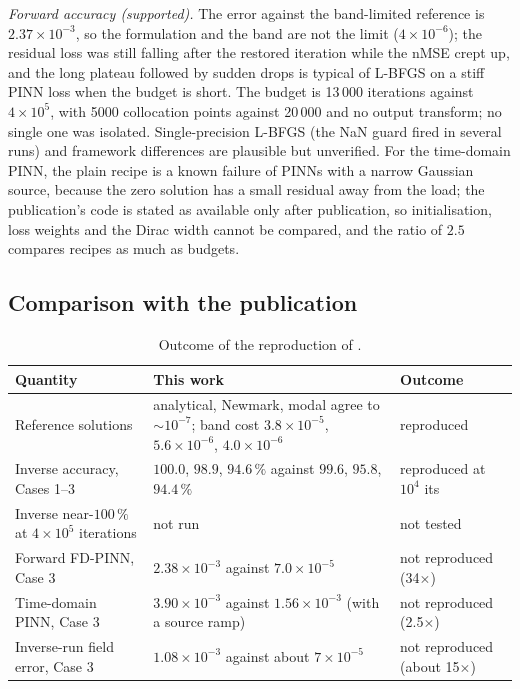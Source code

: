 \emph{Forward accuracy (supported).} The error against the band-limited reference is $2.37\times10^{-3}$, so the formulation and the band are not the limit ($4\times10^{-6}$); the residual loss was still falling after the restored iteration while the nMSE crept up, and the long plateau followed by sudden drops is typical of L-BFGS on a stiff PINN loss when the budget is short. The budget is 13\,000 iterations against $4\times10^5$, with 5000 collocation points against 20\,000 and no output transform; no single one was isolated. Single-precision L-BFGS (the NaN guard fired in several runs) and framework differences are plausible but unverified. For the time-domain PINN, the plain recipe is a known failure of PINNs with a narrow Gaussian source, because the zero solution has a small residual away from the load; the publication's code is stated as available only after publication, so initialisation, loss weights and the Dirac width cannot be compared, and the ratio of $2.5$ compares recipes as much as budgets.

\subsection*{Comparison with the publication}

\begin{table}[tbp]
\centering\footnotesize
\caption{Outcome of the reproduction of \citet{liang2024fdpinn}.}\label{tab:vf-fd-cmp}
\begin{tabularx}{\linewidth}{@{}>{\raggedright\arraybackslash}p{4.4cm} >{\raggedright\arraybackslash}X >{\raggedright\arraybackslash}p{2.6cm}@{}}
\toprule
Quantity & This work & Outcome\\
\midrule
Reference solutions & analytical, Newmark, modal agree to $\sim10^{-7}$; band cost $3.8\times10^{-5}$, $5.6\times10^{-6}$, $4.0\times10^{-6}$ & reproduced\\
Inverse accuracy, Cases 1--3 & $100.0$, $98.9$, $94.6\,\%$ against $99.6$, $95.8$, $94.4\,\%$ & reproduced at $10^4$ its\\
Inverse near-$100\,\%$ at $4\times10^5$ iterations & not run & not tested\\
Forward FD-PINN, Case 3 & $2.38\times10^{-3}$ against $7.0\times10^{-5}$ & not reproduced (34$\times$)\\
Time-domain PINN, Case 3 & $3.90\times10^{-3}$ against $1.56\times10^{-3}$ (with a source ramp) & not reproduced (2.5$\times$)\\
Inverse-run field error, Case 3 & $1.08\times10^{-3}$ against about $7\times10^{-5}$ & not reproduced (about 15$\times$)\\
\bottomrule
\end{tabularx}
\end{table}

